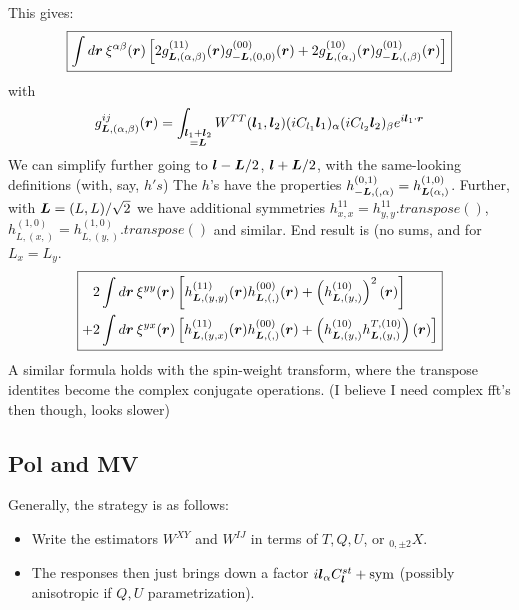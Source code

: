 \documentclass[11pt]{article}
\begin{document}
This gives:
\begin{equation}\boxed{
 \int d\boldsymbol{r} \:	\xi^{\alpha \beta}(\boldsymbol{r}) \left[2g^{(11)}_{\boldsymbol{L}, (\alpha, \beta)}(\boldsymbol{r})g^{(00)}_{-\boldsymbol{L},(0,0)}(\boldsymbol{r}) + 2 g^{(10)}_{\boldsymbol{L}, (\alpha,)}(\boldsymbol{r})g^{(01)}_{-\boldsymbol{L},(,\beta)}(\boldsymbol{r})\right]}
\end{equation}
with
\begin{equation}
	g^{ij}_{\boldsymbol{L}, (\alpha, \beta)}(\boldsymbol{r}) = \int_{\substack{\boldsymbol{l}_1 + \boldsymbol{l}_2 \\ =\boldsymbol{L} }} W^{TT}(\boldsymbol{l}_1,\boldsymbol{l}_2) (i C_{l_1}\boldsymbol{l}_1)_{\alpha} (i C_{l_2}\boldsymbol{l}_2)_{\beta} e^{i \boldsymbol{l}_1 \cdot \boldsymbol{r}}
\end{equation}
We can simplify further going to $\boldsymbol{l} - \boldsymbol{L}/2$, $\boldsymbol{l} + \boldsymbol{L}/2$, with the same-looking definitions (with, say, $h's$) The $h$'s have the properties $h_{-\boldsymbol{L}, (,\alpha)}^{(0, 1)} = h_{\boldsymbol{L} (\alpha,)}^{(1, 0)} $. Further, with $\boldsymbol{L} = (L, L)/\sqrt{2}$ we have additional symmetries $h^{11}_{x,x} = h^{11}_{y,y}.transpose()$, $h^{(1, 0)}_{L,(x,)} = h^{(1, 0)}_{L,(y,)}.transpose()$ and similar. End result is (no sums, and for $L_x  = L_y$.
\begin{equation}
\boxed{
\begin{split}
	&2\int d\boldsymbol{r} \:	\xi^{yy}(\boldsymbol{r}) \left[h^{(11)}_{\boldsymbol{L}, (y,y)}(\boldsymbol{r})h^{(00)}_{\boldsymbol{L},(,)}(\boldsymbol{r}) +  \left(h^{(10)}_{\boldsymbol{L}, (y,)}\right)^2(\boldsymbol{r})\right] \\
	+&2 \int d\boldsymbol{r} \:	\xi^{yx}(\boldsymbol{r})\left[h^{(11)}_{\boldsymbol{L}, (y,x)}(\boldsymbol{r})h^{(00)}_{\boldsymbol{L},(,)}(\boldsymbol{r}) +  \left(h^{(10)}_{\boldsymbol{L}, (y,)}h^{T,(10)}_{\boldsymbol{L}, (y,)}\right)(\boldsymbol{r})\right]
\end{split}
}
\end{equation}
A similar formula holds with the spin-weight transform, where the transpose identites become the complex conjugate operations. (I believe I need complex fft's then though, looks slower)


\subsection{Pol and MV}
Generally, the strategy is as follows:
\begin{itemize}
	\item Write the estimators $W^{XY}$ and $W^{IJ}$ in terms of $T,Q,U$, or $_{0, \pm 2}X$.
	\item The responses then just brings down a factor $i \boldsymbol{l}_\alpha C^{st}_{\boldsymbol{l}} + \rm{sym}$ (possibly anisotropic if $Q, U$ parametrization).
\end{itemize}
\end{document}
